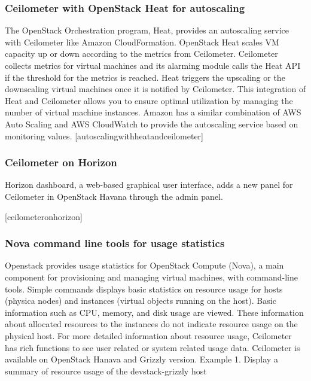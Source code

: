 \documentclass{sig-alternate}
\begin{document}
\subsubsection{Ceilometer with OpenStack Heat for autoscaling}

The OpenStack Orchestration program, Heat, provides an autoscaling service with Ceilometer like Amazon CloudFormation. OpenStack Heat scales VM capacity up or down according to the metrics from Ceilometer. Ceilometer collects metrics for virtual machines and its alarming module calls the Heat API if the threshold for the metrics is reached. Heat triggers the upscaling or the downscaling virtual machines once it is notified by Ceilometer. This integration of Heat and Ceilometer allows you to ensure optimal utilization by managing the number of virtual machine instances. Amazon has a similar combination of AWS Auto Scaling and AWS CloudWatch to provide the autoscaling service based on monitoring values. [autoscalingwithheatandceilometer]

\subsubsection{Ceilometer on Horizon}

Horizon dashboard, a web-based graphical user interface, adds a new panel for Ceilometer in OpenStack Havana through the admin panel.

[ceilometeronhorizon]

\subsubsection{Nova command line tools for usage statistics}

Openstack provides usage statistics for OpenStack Compute (Nova), a main component for provisioning and managing virtual machines, with command-line tools. Simple commands displays basic statistics on resource usage for hosts (physica nodes) and instances (virtual objects running on the host). Basic information such as CPU, memory, and disk usage are viewed. These information about allocated resources to the instances do not indicate resource usage on the physical host. For more detailed information about resource usage, Ceilometer has rich functions to see user related or system related usage data. Ceilometer is available on OpenStack Hanava and Grizzly version. \newline
Example 1. Display a summary of resource usage of the devstack-grizzly host
\end{document}
